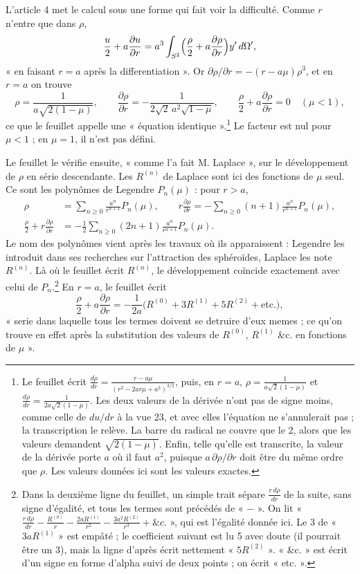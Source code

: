 \documentclass[11pt,a4paper]{article}
\begin{document}
L'article 4 met le calcul sous une forme qui fait voir la difficulté. Comme
\(r\) n'entre que dans \(\rho\),
\[
\frac u2+a\frac{\partial u}{\partial r}
=a^3\int_{S^2}\Bigl(\frac\rho2+a\frac{\partial\rho}{\partial r}\Bigr)y'\,d\Omega',
\]
« en faisant \(r=a\) après la differentiation ». Or
\(\partial\rho/\partial r=-(r-a\mu)\rho^3\), et en \(r=a\) on trouve
\[
\rho=\frac{1}{a\sqrt{2(1-\mu)}},\qquad
\frac{\partial\rho}{\partial r}=-\frac{1}{2\sqrt2\,a^2\sqrt{1-\mu}},\qquad
\frac\rho2+a\frac{\partial\rho}{\partial r}=0\quad(\mu<1),
\]
ce que le feuillet appelle une « équation identique ».\footnote{Le feuillet
écrit \(\frac{d\rho}{dr}=\frac{r-a\mu}{(r^2-2ar\mu+a^2)^{3/2}}\), puis, en
\(r=a\), \(\rho=\frac{1}{a\sqrt2(1-\mu)}\) et
\(\frac{d\rho}{dr}=\frac{1}{2a\sqrt2(1-\mu)}\). Les deux valeurs de la dérivée
n'ont pas de signe moins, comme celle de \(du/dr\) à la vue 23, et avec elles
l'équation ne s'annulerait pas ; la transcription le relève. La barre du
radical ne couvre que le 2, alors que les valeurs demandent \(\sqrt{2(1-\mu)}\).
Enfin, telle qu'elle est transcrite, la valeur de la dérivée porte \(a\) où
il faut \(a^2\), puisque \(a\,\partial\rho/\partial r\) doit être du même ordre
que \(\rho\). Les valeurs données ici sont les valeurs exactes.} Le facteur
est nul pour \(\mu<1\) ; en \(\mu=1\), il n'est pas défini.

Le feuillet le vérifie ensuite, « comme l'a fait M. Laplace », sur le
développement de \(\rho\) en série descendante. Les \(R^{(n)}\) de Laplace
sont ici des fonctions de \(\mu\) seul. Ce sont les polynômes de Legendre
\(P_n(\mu)\) : pour \(r>a\),
\[
\begin{aligned}
\rho&=\sum_{n\ge0}\frac{a^n}{r^{n+1}}P_n(\mu),\qquad
r\frac{\partial\rho}{\partial r}=-\sum_{n\ge0}(n+1)\frac{a^n}{r^{n+1}}P_n(\mu),\\
\frac\rho2+r\frac{\partial\rho}{\partial r}&=-\frac12\sum_{n\ge0}(2n+1)\frac{a^n}{r^{n+1}}P_n(\mu).
\end{aligned}
\]
Le nom des polynômes vient après les travaux où ils apparaissent :
Legendre les introduit dans ses recherches sur l'attraction des sphéroïdes,
Laplace les note \(R^{(n)}\). Là où le feuillet écrit \(R^{(n)}\), le
développement coïncide exactement avec celui de \(P_n\).\footnote{Dans la
deuxième ligne du feuillet, un simple trait sépare
\(\frac{r\,d\rho}{dr}\) de la suite, sans signe d'égalité, et tous les termes
sont précédés de « \(-\) ». On lit
« \(\frac{r\,d\rho}{dr}-\frac{R^{(0)}}{r}-\frac{2aR^{(1)}}{r^2}-\frac{3a^2R^{(2)}}{r^3}+\&c.\) »,
qui est l'égalité donnée ici. Le 3 de « \(3aR^{(1)}\) » est empâté ; le
coefficient suivant est lu 5 avec doute (il pourrait être un 3), mais la
ligne d'après écrit nettement « \(5R^{(2)}\) ». « \&c. » est écrit d'un signe
en forme d'alpha suivi de deux points ; on écrit « etc. ».} En \(r=a\), le
feuillet écrit
\[
\frac\rho2+a\frac{\partial\rho}{\partial r}=-\frac1{2a}\bigl(R^{(0)}+3R^{(1)}+5R^{(2)}+\text{etc.}\bigr),
\]
« serie dans laquelle tous les termes doivent se detruire d'eux memes ; ce
qu'on trouve en effet après la substitution des valeurs de \(R^{(0)}\),
\(R^{(1)}\) \&c. en fonctions de \(\mu\) ».
\end{document}
